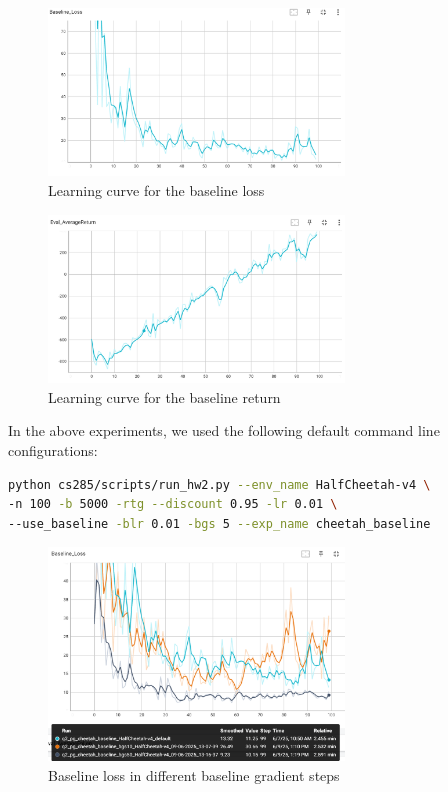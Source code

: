 \documentclass{article}
\begin{document}
\begin{figure}[H]
    \centering
    \includegraphics[width=0.7\textwidth]{img/HalfCheet_baseline_loss.png}
    \caption{Learning curve for the baseline loss}
    \label{fig:baseline_loss}
\end{figure}

\begin{figure}[H]
    \centering
    \includegraphics[width=0.7\textwidth]{img/HalfCheet_baseline_return.png}
    \caption{Learning curve for the baseline return}
    \label{fig:baseline_return}
\end{figure}
In the above experiments, we used the following default command line configurations:
\begin{lstlisting}[language=bash]
python cs285/scripts/run_hw2.py --env_name HalfCheetah-v4 \
-n 100 -b 5000 -rtg --discount 0.95 -lr 0.01 \
--use_baseline -blr 0.01 -bgs 5 --exp_name cheetah_baseline
\end{lstlisting}


\begin{figure}[H]
    \centering
    \includegraphics[width=0.7\textwidth]{img/HalfCheet_baseline_bgs_loss.png}
    \caption{Baseline loss in different baseline gradient steps}
    \label{fig:baseline_loss_bgs}
\end{figure}
\end{document}
